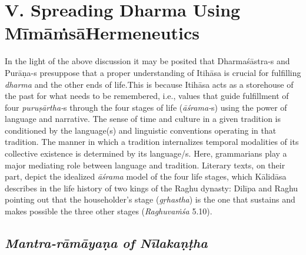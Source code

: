 \section*{V. Spreading Dharma Using Mīmāṁsā\hfill \break Hermeneutics}

In the light of the above discussion it may be posited that Dharmaśāstra-s and Purāṇa-s presuppose that a proper understanding of Itihāsa is crucial for fulfilling \textit{dharma} and the other ends of life.This is because Itihāsa acts as a storehouse of the past for what needs to be remembered, i.e., values that guide fulfillment of four \textit{puruṣārtha-}s through the four stages of life (\textit{āśrama-}s) using the power of language and narrative. The sense of time and culture in a given tradition is conditioned by the language(s) and linguistic conventions operating in that tradition. The manner in which a tradition internalizes temporal modalities of its collective existence is determined by its language/s. Here, grammarians play a major mediating role between language and tradition. Literary texts, on their part, depict the idealized \textit{āśrama} model of the four life stages, which Kālidāsa describes in the life history of two kings of the Raghu dynasty: Dilīpa and Raghu pointing out that the householder’s stage (\textit{gṛhastha}) is the one that sustains and makes possible the three other stages (\textit{Raghuvaṁśa} 5.10).

\newpage

\subsection*{\textit{Mantra-rāmāyaṇa of Nīlakaṇṭha}}

